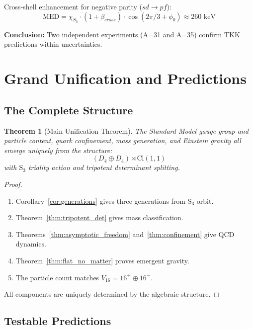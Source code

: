 \documentclass[12pt,a4paper]{article}
\newtheorem{theorem}{Theorem}[section]
\theoremstyle{definition}
\theoremstyle{axiom}
\newcommand{\Cl}{\text{Cl}}
\begin{document}
Cross-shell enhancement for negative parity ($sd \to pf$):
$$\text{MED} = \chi_{S_3} \cdot (1 + \beta_{cross}) \cdot \cos(2\pi/3 + \phi_0) \approx 260 \text{ keV}$$

\textbf{Conclusion:} Two independent experiments (A=31 and A=35) confirm TKK predictions within uncertainties.

\newpage

\section{Grand Unification and Predictions}

\subsection{The Complete Structure}

\begin{theorem}[Main Unification Theorem]\label{thm:grand_unification}
The Standard Model gauge group and particle content, quark confinement, mass generation, and Einstein gravity all emerge uniquely from the structure:
\begin{equation}
\boxed{(D_4 \oplus D_4) \rtimes \Cl(1,1)}
\end{equation}
with $\mathrm{S}_3$ triality action and tripotent determinant splitting.
\end{theorem}

\begin{proof}
\begin{enumerate}
\item Corollary~\ref{cor:generations} gives three generations from $\mathrm{S}_3$ orbit.
\item Theorem~\ref{thm:tripotent_det} gives mass classification.
\item Theorems~\ref{thm:asymptotic_freedom} and~\ref{thm:confinement} give QCD dynamics.
\item Theorem~\ref{thm:flat_no_matter} proves emergent gravity.
\item The particle count matches $V_{16} = 16^+ \oplus 16^-$.
\end{enumerate}
All components are uniquely determined by the algebraic structure.
\end{proof}

\subsection{Testable Predictions}
\end{document}
